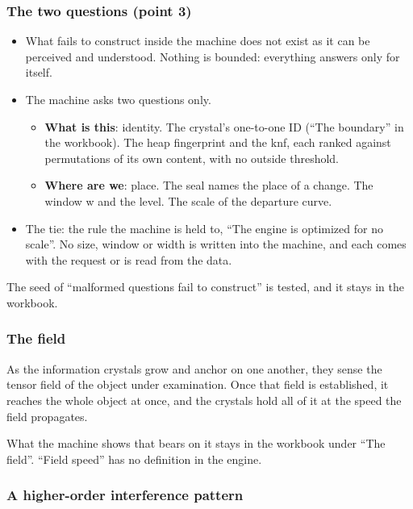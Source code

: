 \subsubsection{\texorpdfstring{The two questions (point 3)}{The two questions (point 3)}}

\begin{itemize}
\item What fails to construct inside the machine does not exist as it can be perceived and understood. Nothing is bounded: everything answers only for itself.
\item The machine asks two questions only.

\begin{itemize}
\item \textbf{What is this}: identity. The crystal's one-to-one ID (“The boundary” in the workbook). The heap fingerprint and the knf, each ranked against permutations of its own content, with no outside threshold.
\item \textbf{Where are we}: place. The seal names the place of a change. The window w and the level. The scale of the departure curve.
\end{itemize}
\item The tie: the rule the machine is held to, “The engine is optimized for no scale”. No size, window or width is written into the machine, and each comes with the request or is read from the data.
\end{itemize}

The seed of “malformed questions fail to construct” is tested, and it stays in the workbook.

\subsubsection{\texorpdfstring{The field}{The field}}

As the information crystals grow and anchor on one another, they sense the tensor field of the object under examination. Once that field is established, it reaches the whole object at once, and the crystals hold all of it at the speed the field propagates.

What the machine shows that bears on it stays in the workbook under “The field”. “Field speed” has no definition in the engine.

\subsubsection{\texorpdfstring{A higher-order interference pattern}{A higher-order interference pattern}}

